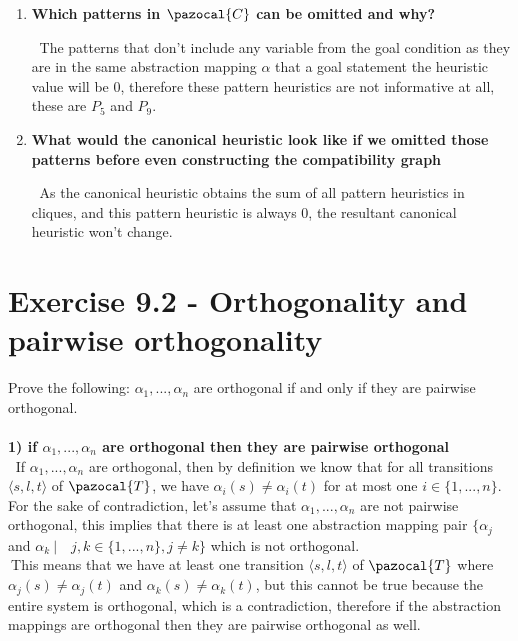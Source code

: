 \documentclass[11pt,a4paper]{article}
\begin{document}
\begin{enumerate}[label=(\alph*), listparindent=1.5em]
\begin{multicols}{3}
		\[ h^{\pazocal{C}}=13\]
	\end{multicols}
	\item \textbf{Which patterns in $\pazocal{C}$ can be omitted and why?}
	
	$\>$ The patterns that don't include any variable from the goal 
	condition as they are in the same abstraction mapping $\alpha$ 
	that a goal statement the heuristic value will be 0, therefore 
	these pattern heuristics are not informative at all, these are 
	$P_5$ and $P_9$. \\
	
	\item \textbf{What would the canonical heuristic look like if we omitted
	those patterns before even constructing the compatibility graph}
	
	$\>$ As the canonical heuristic obtains the sum of all pattern 
	heuristics in cliques, and this pattern heuristic is always 0, 
	the resultant canonical heuristic won't change.\\
\end{enumerate}
\pagebreak
\section*{Exercise 9.2 - Orthogonality and pairwise orthogonality}
Prove the following: $\alpha_1, ..., \alpha_n$ are orthogonal if and only if they are pairwise orthogonal.\\\\

\textbf{1) if $\alpha_1, ..., \alpha_n$ are orthogonal then 
they are pairwise orthogonal}\\

$\>$ If $\alpha_1, ..., \alpha_n$ are orthogonal, then by 
definition we know that for all transitions 
$\langle s, l, t\rangle$ of $\pazocal{T}$, 
we have $\alpha_i(s) \neq \alpha_i(t)$  for at most one 
$i \in \{1, ... , n\}$.
For the sake of contradiction, let's assume that 
$\alpha_1, ..., \alpha_n$ 
are not pairwise orthogonal, this implies that there 
is at least one abstraction mapping pair 
$\{ \alpha_j$ and $\alpha_k \ |\quad j,k \in \{1,...,n\},j \neq k \}$
which is not orthogonal. \\

$\>$This means that we have at least one transition 
$\langle s, l, t \rangle$ of $\pazocal{T}$ where 
$\alpha_j(s) \neq \alpha_j(t)$ and $\alpha_k(s) \neq \alpha_k(t)$, 
but this cannot be true because the entire system is orthogonal, 
which is a contradiction, therefore 
if the abstraction mappings are orthogonal then they are
pairwise orthogonal as well.\\\\
\end{document}

